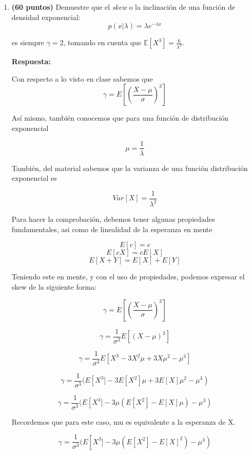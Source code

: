 \documentclass{article}
\begin{document}
\begin{enumerate}
\item \textbf{(60 puntos)} Demuestre que el \emph{skew }o la inclinación
de una función de densidad exponencial: 
\[
p\left(x|\lambda\right)=\lambda e^{-\lambda x}
\]



\par es siempre $\gamma=2$, tomando en cuenta que $\mathbb{E}\left[X^{3}\right]=\frac{6}{\lambda^{3}}$. 

\par \textbf{Respuesta:} 

Con respecto a lo visto en clase sabemos que 
\[
\gamma = E\left[ \left( \frac{{X - \mu}}{\sigma} \right)^3 \right]
\]

\par Así mismo, también conocemos que para una función de distribución exponencial

\[
\mu = \frac{1}{\lambda}
\]

\par También, del material sabemos que la varianza de una función distribución exponencial es 

\[
Var[X] = \frac{1}{\lambda^2}
\]

\par Para hacer la comprobación, debemos tener algunas propiedades fundamentales, asi como de linealidad de la esperanza en mente 

\[
E[c] = c
\]
\[
E[cX] = cE[X]
\]
\[
E[X + Y] = E[X] + E[Y]
\]

\par Teniendo este en mente, y con el uso de propiedades, podemos expresar el skew de la siguiente forma:

\[
\gamma = E\left[ \left( \frac{{X - \mu}}{\sigma} \right)^3 \right]
\]

\[
\gamma = \frac{1}{\sigma^3}     E\left[ \left( X - \mu \right)^3 \right]
\]

\[
\gamma = \frac{1}{\sigma^3}     E\left[ X^3 - 3X^2\mu + 3X\mu^2 - \mu^3  \right]
\]

\[
\gamma = \frac{1}{\sigma^3}    ( E\left[ X^3] - 3E[X^2]\mu + 3E[X]\mu^2 - \mu^3  \right)
\]

\[
\gamma = \frac{1}{\sigma^3}    ( E\left[ X^3] - 3\mu(E[X^2] - E[X]\mu) - \mu^3  \right)
\]

\par Recordemos que para este caso, mu es equivalente a la esperanza de X. 

\[
\gamma = \frac{1}{\sigma^3}    ( E\left[ X^3] - 3\mu(E[X^2] - E[X]^2) - \mu^3  \right)
\]


\end{enumerate}
\end{document}
